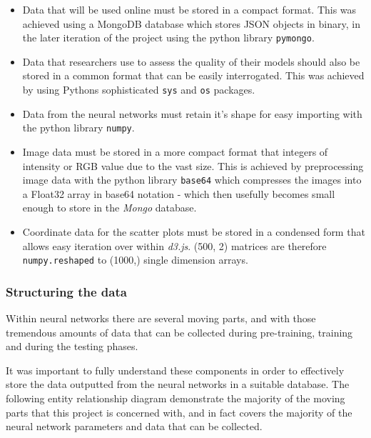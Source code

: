 \documentclass[a4paper,11pt,titlepage]{article}
\begin{document}
	\begin{itemize}
		\item Data that will be used online must be stored in a compact format. This was achieved using a MongoDB database which stores JSON objects in binary, in the later iteration of the project using the python library \texttt{pymongo}.
		\item Data that researchers use to assess the quality of their models should also be stored in a common format that can be easily interrogated. This was achieved by using Pythons sophisticated \texttt{sys} and \texttt{os} packages.
		\item Data from the neural networks must retain it's shape for easy importing with the python library \texttt{numpy}.
		\item Image data must be stored in a more compact format that integers of intensity or RGB value due to the vast size. This is achieved by preprocessing image data with the python library \texttt{base64} which compresses the images into a Float32 array in base64 notation - which then usefully becomes small enough to store in the \textit{Mongo} database.
		\item Coordinate data for the scatter plots must be stored in a condensed form that allows easy iteration over within \textit{d3.js}. (500, 2) matrices are therefore \texttt{numpy.reshaped} to (1000,) single dimension arrays.
	\end{itemize}
	
	\subsubsection{Structuring the data}
	Within neural networks there are several moving parts, and with those tremendous amounts of data that can be collected during pre-training, training and during the testing phases. 
	\par 
	It was important to fully understand these components in order to effectively store the data outputted from the neural networks in a suitable database. The following entity relationship diagram demonstrate the majority of the moving parts that this project is concerned with, and in fact covers the majority of the neural network parameters and data that can be collected. 
		
\end{document}
